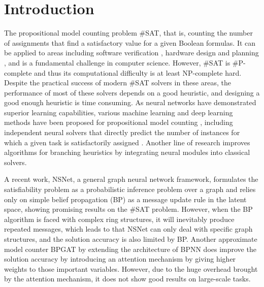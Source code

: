 \section{Introduction}

The propositional model counting problem \#SAT, that is, counting the number of assignments
that find a satisfactory value for a given Boolean formulas. It can be applied to areas 
including software verification \cite{DBLP:journals/fmsd/ClarkeBRZ01}\cite{DBLP:journals/tcs/IvancicYGGA08}, 
hardware design and planning \cite{DBLP:conf/dac/SilvaS00}\cite{DBLP:conf/fmcad/SheeranSS00}
\cite{DBLP:conf/aips/DomshlakH06}, and is a fundamental challenge in computer science. However, 
\#SAT is \#P-complete and thus its computational difficulty is at least NP-complete hard. 
Despite the practical success of modern \#SAT solvers in these areas, the performance of 
most of these solvers depends on a good heuristic, and designing a good enough heuristic is 
time consuming. As neural networks have demonstrated superior learning capabilities, various
machine learning and deep learning methods have been proposed for propositional model counting
\cite{DBLP:conf/aaai/VaezipoorLWMGSB21}\cite{Atkari_2019_10}\cite{DBLP:conf/ijcnn/OzolinsFDGZK22}, 
including independent neural solvers that directly predict the number of instances for which 
a given task is satisfactorily assigned \cite{DBLP:conf/iclr/AmizadehMW19}\cite{DBLP:journals/corr/abs-1903-01969}. 
Another line of research improves algorithms for branching heuristics by integrating neural 
modules into classical solvers. 

A recent work, NSNet\cite{DBLP:conf/nips/LiS22}, a general graph neural network framework, 
formulates the satisfiability problem as a probabilistic inference problem over a graph and 
relies only on simple belief propagation (BP) as a message update rule in the latent space, 
showing promising results on the \#SAT problem. However, when the BP algorithm is faced with 
complex ring structures, it will inevitably produce repeated messages, which leads to that 
NSNet can only deal with specific graph structures, and the solution accuracy is also limited 
by BP. Another approximate model counter BPGAT\cite{DBLP:conf/esann/Saveri22} by extending 
the architecture of BPNN\cite{DBLP:conf/nips/KuckCTLSSE20} does improve the solution accuracy 
by introducing an attention mechanism by giving higher weights to those important variables. 
However, due to the huge overhead brought by the attention mechanism, it does not show good 
results on large-scale tasks.

